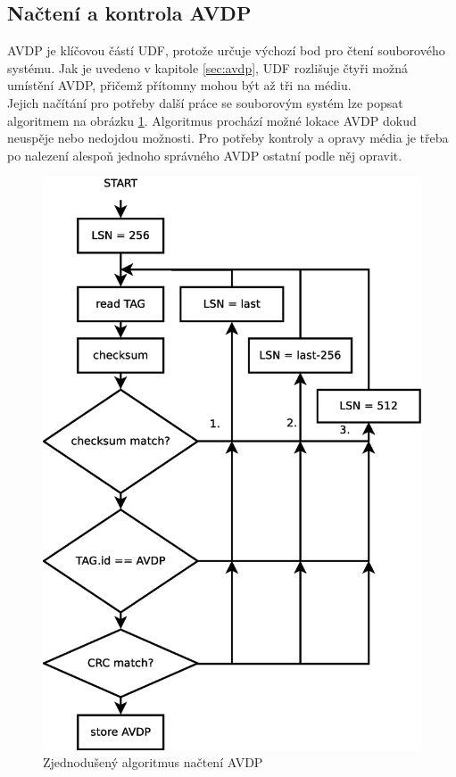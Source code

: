 \subsection{Načtení a kontrola AVDP}
AVDP je klíčovou částí UDF, protože určuje výchozí bod pro čtení souborového systému. Jak je uvedeno v kapitole \ref{sec:avdp}, UDF rozlišuje čtyři možná umístění AVDP, přičemž přítomny mohou být až tři na médiu.\\
Jejich načítání pro potřeby další práce se souborovým systém lze popsat algoritmem na obrázku \ref{fig:avdp}. Algoritmus prochází možné lokace AVDP dokud neuspěje nebo nedojdou možnosti. Pro potřeby kontroly a opravy média je třeba po nalezení alespoň jednoho správného AVDP ostatní podle něj opravit.
\begin{figure}[ht] 
    \centering
    \includegraphics[scale=0.4]{obrazky/avdp.eps}
    \caption{Zjednodušený algoritmus načtení AVDP}
    \label{fig:avdp}
\end{figure}

